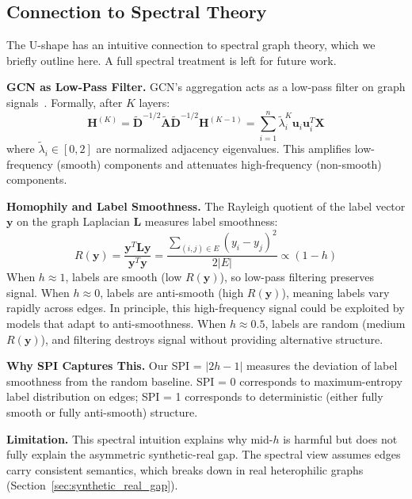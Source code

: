 \subsection{Connection to Spectral Theory}

The U-shape has an intuitive connection to spectral graph theory, which we briefly outline here. A full spectral treatment is left for future work.

\textbf{GCN as Low-Pass Filter.} GCN's aggregation acts as a low-pass filter on graph signals~\cite{wu2019sgc}. Formally, after $K$ layers:
\begin{equation}
    \mathbf{H}^{(K)} = \tilde{\mathbf{D}}^{-1/2} \tilde{\mathbf{A}} \tilde{\mathbf{D}}^{-1/2} \mathbf{H}^{(K-1)} = \sum_{i=1}^{n} \tilde{\lambda}_i^K \mathbf{u}_i \mathbf{u}_i^T \mathbf{X}
\end{equation}
where $\tilde{\lambda}_i \in [0, 2]$ are normalized adjacency eigenvalues. This amplifies low-frequency (smooth) components and attenuates high-frequency (non-smooth) components.

\textbf{Homophily and Label Smoothness.} The Rayleigh quotient of the label vector $\mathbf{y}$ on the graph Laplacian $\mathbf{L}$ measures label smoothness:
\begin{equation}
    R(\mathbf{y}) = \frac{\mathbf{y}^T \mathbf{L} \mathbf{y}}{\mathbf{y}^T \mathbf{y}} = \frac{\sum_{(i,j) \in E} (y_i - y_j)^2}{2|E|} \propto (1 - h)
\end{equation}
When $h \approx 1$, labels are smooth (low $R(\mathbf{y})$), so low-pass filtering preserves signal. When $h \approx 0$, labels are anti-smooth (high $R(\mathbf{y})$), meaning labels vary rapidly across edges. In principle, this high-frequency signal could be exploited by models that adapt to anti-smoothness. When $h \approx 0.5$, labels are random (medium $R(\mathbf{y})$), and filtering destroys signal without providing alternative structure.

\textbf{Why SPI Captures This.} Our SPI = $|2h-1|$ measures the deviation of label smoothness from the random baseline. SPI = 0 corresponds to maximum-entropy label distribution on edges; SPI = 1 corresponds to deterministic (either fully smooth or fully anti-smooth) structure.

\textbf{Limitation.} This spectral intuition explains why mid-$h$ is harmful but does not fully explain the asymmetric synthetic-real gap. The spectral view assumes edges carry consistent semantics, which breaks down in real heterophilic graphs (Section~\ref{sec:synthetic_real_gap}).

